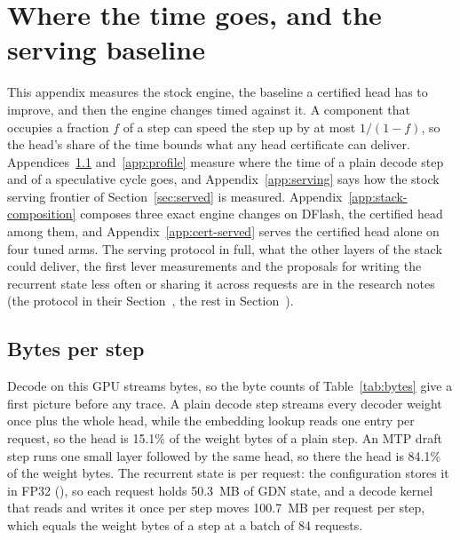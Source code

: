 \section{Where the time goes, and the serving baseline}\label{app:stack}\label{sec:stack}\label{sec:time}
This appendix measures the stock engine, the baseline a certified head has to improve, and then the engine changes timed against it. A component that occupies a fraction $f$ of a step can speed the step up by at most $1/(1-f)$, so the head's share of the time bounds what any head certificate can deliver. Appendices~\ref{app:bytes} and~\ref{app:profile} measure where the time of a plain decode step and of a speculative cycle goes, and Appendix~\ref{app:serving} says how the stock serving frontier of Section~\ref{sec:served} is measured. Appendix~\ref{app:stack-composition} composes three exact engine changes on DFlash, the certified head among them, and Appendix~\ref{app:cert-served} serves the certified head alone on four tuned arms. The serving protocol in full, what the other layers of the stack could deliver, the first lever measurements and the proposals for writing the recurrent state less often or sharing it across requests are in the research notes (the protocol in their Section~, the rest in Section~).

\subsection{Bytes per step}\label{app:bytes}\label{sec:time-bytes}
Decode on this GPU streams bytes, so the byte counts of Table~\ref{tab:bytes} give a first picture before any trace. A plain decode step streams every decoder weight once plus the whole head, while the embedding lookup reads one entry per request, so the head is 15.1\% of the weight bytes of a plain step. An MTP draft step runs one small layer followed by the same head, so there the head is 84.1\% of the weight bytes. The recurrent state is per request: the configuration stores it in FP32 (), so each request holds 50.3~MB of GDN state, and a decode kernel that reads and writes it once per step moves 100.7~MB per request per step, which equals the weight bytes of a step at a batch of 84 requests.

